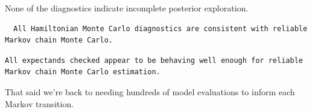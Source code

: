 \documentclass[
  letterpaper,
  DIV=11,
  numbers=noendperiod]{scrartcl}
\newenvironment{Shaded}{\begin{snugshade}}{\end{snugshade}}
\newcommand{\AttributeTok}[1]{\textcolor[rgb]{0.40,0.45,0.13}{#1}}
\newcommand{\ConstantTok}[1]{\textcolor[rgb]{0.56,0.35,0.01}{#1}}
\newcommand{\DecValTok}[1]{\textcolor[rgb]{0.68,0.00,0.00}{#1}}
\newcommand{\FunctionTok}[1]{\textcolor[rgb]{0.28,0.35,0.67}{#1}}
\newcommand{\NormalTok}[1]{\textcolor[rgb]{0.00,0.23,0.31}{#1}}
\newcommand{\OtherTok}[1]{\textcolor[rgb]{0.00,0.23,0.31}{#1}}
\newcommand{\SpecialCharTok}[1]{\textcolor[rgb]{0.37,0.37,0.37}{#1}}
\newcommand{\StringTok}[1]{\textcolor[rgb]{0.13,0.47,0.30}{#1}}
\begin{document}
None of the diagnostics indicate incomplete posterior exploration.

\begin{Shaded}
\end{Shaded}

\begin{verbatim}
  All Hamiltonian Monte Carlo diagnostics are consistent with reliable
Markov chain Monte Carlo.
\end{verbatim}

\begin{Shaded}
\end{Shaded}

\begin{verbatim}
All expectands checked appear to be behaving well enough for reliable
Markov chain Monte Carlo estimation.
\end{verbatim}

That said we're back to needing hundreds of model evaluations to inform
each Markov transition.

\begin{Shaded}
\end{Shaded}
\end{document}
